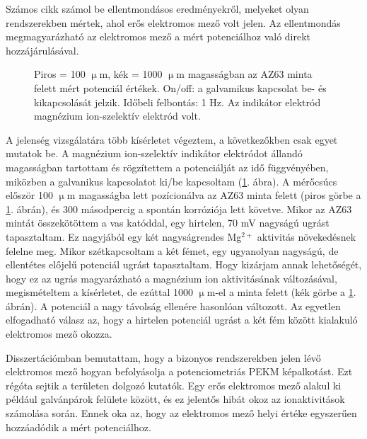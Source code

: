 Számos cikk számol be ellentmondásos eredményekről, melyeket olyan rendszerekben mértek, ahol erős elektromos mező volt jelen.
Az ellentmondás megmagyarázható az elektromos mező a mért potenciálhoz való direkt hozzájárulásával.

\begin{figure}
\centering
{}
\caption{Piros = 100 $\upmu$m, kék = 1000 $\upmu$m magasságban az AZ63 minta felett mért potenciál értékek. On/off: a galvamikus kapcsolat be- és kikapcsolását jelzik. Időbeli felbontás: 1 Hz. Az indikátor elektród magnézium ion-szelektív elektród volt.}
\label{fig:approach}
\end{figure}

A jelenség vizsgálatára több kísérletet végeztem, a következőkben csak egyet mutatok be.
A magnézium ion-szelektív indikátor elektródot állandó magasságban tartottam és rögzítettem a potenciálját az idő függvényében, miközben a galvanikus kapcsolatot ki/be kapcsoltam (\ref{fig:approach}. ábra).
A mérőcsúcs először 100 $\upmu$m magasságba lett pozícionálva az AZ63 minta felett (piros görbe a \ref{fig:approach}. ábrán), és 300 másodpercig a spontán korróziója lett követve.
Mikor az AZ63 mintát összekötöttem a vas katóddal, egy hirtelen, 70 mV nagyságú ugrást tapasztaltam.
Ez nagyjából egy két nagyságrendes Mg$^{2+}$ aktivitás növekedésnek felelne meg.
Mikor szétkapcsoltam a két fémet, egy ugyanolyan nagyságú, de ellentétes előjelű potenciál ugrást tapasztaltam.
Hogy kizárjam annak lehetőségét, hogy ez az ugrás magyarázható a magnézium ion aktivitásának változásával, megismételtem a kísérletet, de ezúttal 1000 $\upmu$m-el a minta felett (kék görbe a \ref{fig:approach}. ábrán).
A potenciál a nagy távolság ellenére hasonlóan változott.
Az egyetlen elfogadható válasz az, hogy a hirtelen potenciál ugrást a két fém között kialakuló elektromos mező okozza.

Disszertációmban bemutattam, hogy a bizonyos rendszerekben jelen lévő elektromos mező hogyan befolyásolja a potenciometriás PEKM képalkotást.
Ezt régóta sejtik a területen dolgozó kutatók.
Egy erős elektromos mező alakul ki például galvánpárok felülete között, és ez jelentős hibát okoz az ionaktivitások számolása során.
Ennek oka az, hogy az elektromos mező helyi értéke egyszerűen hozzáadódik a mért potenciálhoz.

